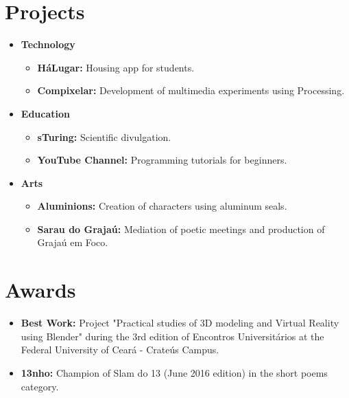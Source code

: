 \documentclass[letterpaper,11pt]{article}
\newcommand{\resumeItem}[2]{
  \item\small{
    \textbf{#1}{ #2 \vspace{-2pt}}
  }
}
\newcommand{\resumeSubItem}[2]{\resumeItem{#1}{#2}\vspace{-4pt}}
\newcommand{\resumeSubHeadingListStart}{\begin{itemize}[leftmargin=*]}
\newcommand{\resumeSubHeadingListEnd}{\end{itemize}}
\begin{document}
\section{\faRocket \hspace{0.2cm} Projects}
  \resumeSubHeadingListStart
    \resumeSubItem{Technology}{}
        \begin{itemize}
            \item \textbf{HáLugar:} Housing app for students. \href{https://play.google.com/store/apps/details?id=br.ufc.crateus.halugar}{\faInfoCircle}
            \item \textbf{Compixelar:} Development of multimedia experiments using Processing. \href{https://medium.com/@danielhbrito}{\faInfoCircle}
        \end{itemize}
    \resumeSubItem{Education}{}
        \begin{itemize}
            \item \textbf{sTuring:} Scientific divulgation. \href{https://www.instagram.com/sturing.compsci/}{\faInfoCircle}
            \item \textbf{YouTube Channel:}  Programming tutorials for beginners. \href{https://www.youtube.com/channel/UC4y3uq1d7MKDYs1LbI44Vng}{\faInfoCircle}
        \end{itemize}
    \resumeSubItem{Arts}{}
        \begin{itemize}
            \item \textbf{Aluminions:} Creation of characters using aluminum seals. \href{https://www.instagram.com/aluminions.13/}{\faInfoCircle}
            \item \textbf{Sarau do Grajaú:} Mediation of poetic meetings and production of Grajaú em Foco. \href{https://www.facebook.com/Sarau-do-Graja\%C3\%BA-191479077716775}{\faInfoCircle} 
        \end{itemize}
  \resumeSubHeadingListEnd

\section{\faTrophy \hspace{0.2cm} Awards}
  \resumeSubHeadingListStart
    \resumeSubItem{Best Work:}
      {Project "Practical studies of 3D modeling and Virtual Reality using Blender" during the 3rd edition of Encontros Universitários at the Federal University of Ceará - Crateús Campus.}
    \resumeSubItem{13nho:}
      {Champion of Slam do 13 (June 2016 edition) in the short poems category.}
    \vspace{0.3cm}
  \resumeSubHeadingListEnd
\end{document}
